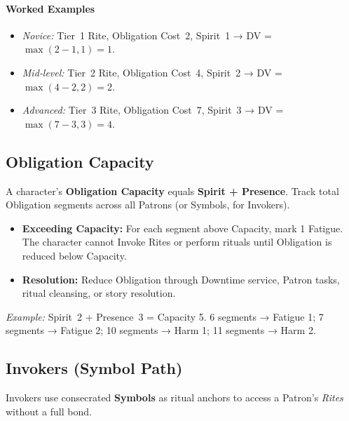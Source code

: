\paragraph{Worked Examples}
\begin{itemize}
    \item \emph{Novice:} Tier~1 Rite, Obligation Cost~2, Spirit~1 → DV = $\max(2-1,1)=1$.
    \item \emph{Mid‑level:} Tier~2 Rite, Obligation Cost~4, Spirit~2 → DV = $\max(4-2,2)=2$.
    \item \emph{Advanced:} Tier~3 Rite, Obligation Cost~7, Spirit~3 → DV = $\max(7-3,3)=4$.
\end{itemize}

\subsection{Obligation Capacity}\label{sec:obligation_capacity}

A character's \textbf{Obligation Capacity} equals \textbf{Spirit + Presence}. Track total Obligation segments across all Patrons (or Symbols, for Invokers).

\begin{itemize}
    \item \textbf{Exceeding Capacity:} For each segment above Capacity, mark 1 Fatigue. The character cannot Invoke Rites or perform rituals until Obligation is reduced below Capacity.
    \item \textbf{Resolution:} Reduce Obligation through Downtime service, Patron tasks, ritual cleansing, or story resolution.
\end{itemize}
\textit{Example:} Spirit~2 + Presence~3 = Capacity 5. 6 segments → Fatigue 1; 7 segments → Fatigue 2; 10 segments → Harm 1; 11 segments → Harm 2.

\subsection{Invokers (Symbol Path)}\label{subsec:invokers}

Invokers use consecrated \textbf{Symbols} as ritual anchors to access a Patron's \emph{Rites} without a full bond.

